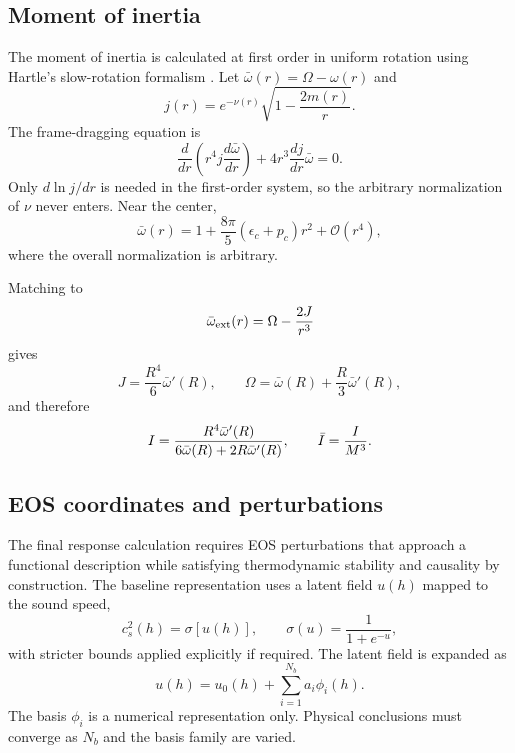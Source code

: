 \subsection{Moment of inertia}

The moment of inertia is calculated at first order in uniform rotation using
Hartle's slow-rotation formalism \cite{hartle1967rotation}.  Let
\(\bar\omega(r)=\Omega-\omega(r)\) and
\begin{equation}
    j(r)
    =
    e^{-\nu(r)}
    \sqrt{1-\frac{2m(r)}{r}}.
\end{equation}
The frame-dragging equation is
\begin{equation}
    \frac{d}{dr}
    \left(
      r^4j\frac{d\bar\omega}{dr}
    \right)
    +
    4r^3\frac{dj}{dr}\bar\omega
    =0.
    \label{eq:hartle}
\end{equation}
Only \(d\ln j/dr\) is needed in the first-order system, so the arbitrary
normalization of \(\nu\) never enters. Near the center,
\begin{equation}
    \bar\omega(r)
    =
    1
    +
    \frac{8\pi}{5}(\epsilon_c+p_c)r^2
    +\mathcal O(r^4),
    \label{eq:w-center}
\end{equation}
where the overall normalization is arbitrary.

Matching to
\begin{equation}
    \bar\omega_{\rm ext}(r)
    =
    \Omega-\frac{2J}{r^3}
\end{equation}
gives
\begin{equation}
    J=\frac{R^4}{6}\bar\omega'(R),
    \qquad
    \Omega
    =
    \bar\omega(R)
    +
    \frac{R}{3}\bar\omega'(R),
\end{equation}
and therefore
\begin{equation}
    I
    =
    \frac{R^4\bar\omega'(R)}
    {6\bar\omega(R)+2R\bar\omega'(R)},
    \qquad
    \bar I=\frac{I}{M^3}.
    \label{eq:I}
\end{equation}

\subsection{EOS coordinates and perturbations}

The final response calculation requires EOS perturbations that approach a functional description while satisfying thermodynamic stability and causality by construction. The baseline representation uses a latent field \(u(h)\) mapped to the sound speed,
\begin{equation}
    c_s^2(h)=\sigma[u(h)],
    \qquad
    \sigma(u)=\frac{1}{1+e^{-u}},
    \label{eq:cs-map}
\end{equation}
with stricter bounds applied explicitly if required. The latent field is expanded as
\begin{equation}
    u(h)=u_0(h)+\sum_{i=1}^{N_b}a_i\phi_i(h).
    \label{eq:basis}
\end{equation}
The basis \(\phi_i\) is a numerical representation only. Physical conclusions must converge as \(N_b\) and the basis family are varied.

